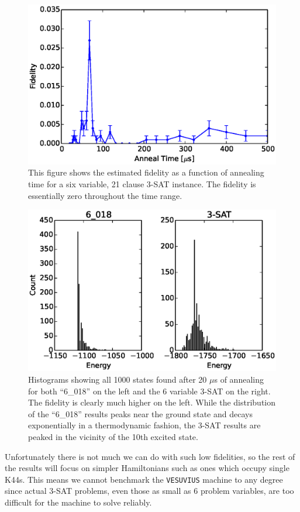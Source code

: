 \begin{figure}
	\includegraphics{img/test_6.eps}
	\caption[Result of a 6 Variable 3-SAT Instance]{This figure shows the estimated fidelity as a function of annealing time for a six variable, 21 clause 3-SAT instance.  The fidelity is essentially zero throughout the time range.}
	\label{fig:test_6}
\end{figure}

\begin{figure}
	\includegraphics{img/hist.eps}
	\caption[20 $\mu$s Result State Histograms]{Histograms showing all 1000 states found after 20 $\mu$s of annealing for both ``6\_018'' on the left and the 6 variable 3-SAT on the right.  The fidelity is clearly much higher on the left.  While the distribution of the ``6\_018'' results peaks near the ground state and decays exponentially in a thermodynamic fashion, the 3-SAT results are peaked in the vicinity of the 10th excited state.}
	\label{fig:test_6_hist}
\end{figure}

Unfortunately there is not much we can do with such low fidelities, so the rest of the results will focus on simpler Hamiltonians such as ones which occupy single K44s.  This means we cannot benchmark the \texttt{VESUVIUS} machine to any degree since actual 3-SAT problems, even those as small as 6 problem variables, are too difficult for the machine to solve reliably.
